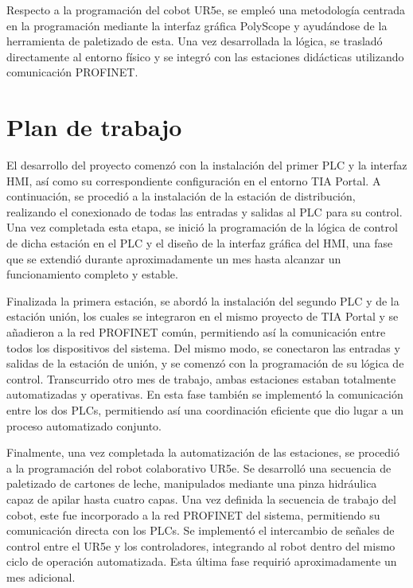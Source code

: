 Respecto a la programación del cobot UR5e, se empleó una metodología centrada en la programación mediante la interfaz gráfica PolyScope y ayudándose de la herramienta de paletizado de esta. Una vez desarrollada la lógica, se trasladó directamente al entorno físico y se integró con las estaciones didácticas utilizando comunicación PROFINET.

\section{Plan de trabajo}
\label{sec:plantrabajo}

El desarrollo del proyecto comenzó con la instalación del primer PLC y la interfaz HMI, así como su correspondiente configuración en el entorno TIA Portal. A continuación, se procedió a la instalación de la estación de distribución, realizando el conexionado de todas las entradas y salidas al PLC para su control. Una vez completada esta etapa, se inició la programación de la lógica de control de dicha estación en el PLC y el diseño de la interfaz gráfica del HMI, una fase que se extendió durante aproximadamente un mes hasta alcanzar un funcionamiento completo y estable.

Finalizada la primera estación, se abordó la instalación del segundo PLC y de la estación unión, los cuales se integraron en el mismo proyecto de TIA Portal y se añadieron a la red PROFINET común, permitiendo así la comunicación entre todos los dispositivos del sistema. Del mismo modo, se conectaron las entradas y salidas de la estación de unión, y se comenzó con la programación de su lógica de control. Transcurrido otro mes de trabajo, ambas estaciones estaban totalmente automatizadas y operativas. En esta fase también se implementó la comunicación entre los dos PLCs, permitiendo así una coordinación eficiente que dio lugar a un proceso automatizado conjunto.

Finalmente, una vez completada la automatización de las estaciones, se procedió a la programación del robot colaborativo UR5e. Se desarrolló una secuencia de paletizado de cartones de leche, manipulados mediante una pinza hidráulica capaz de apilar hasta cuatro capas. Una vez definida la secuencia de trabajo del cobot, este fue incorporado a la red PROFINET del sistema, permitiendo su comunicación directa con los PLCs. Se implementó el intercambio de señales de control entre el UR5e y los controladores, integrando al robot dentro del mismo ciclo de operación automatizada. Esta última fase requirió aproximadamente un mes adicional.


